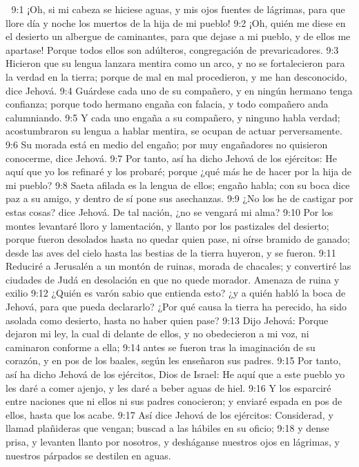 
9:1 ¡Oh, si mi cabeza se hiciese aguas, y mis ojos fuentes de lágrimas, para que llore día y noche los muertos de la hija de mi pueblo!  
9:2 ¡Oh, quién me diese en el desierto un albergue de caminantes, para que dejase a mi pueblo, y de ellos me apartase! Porque todos ellos son adúlteros, congregación de prevaricadores.  
9:3 Hicieron que su lengua lanzara mentira como un arco, y no se fortalecieron para la verdad en la tierra; porque de mal en mal procedieron, y me han desconocido, dice Jehová.  
9:4 Guárdese cada uno de su compañero, y en ningún hermano tenga confianza; porque todo hermano engaña con falacia, y todo compañero anda calumniando.  
9:5 Y cada uno engaña a su compañero, y ninguno habla verdad; acostumbraron su lengua a hablar mentira, se ocupan de actuar perversamente.  
9:6 Su morada está en medio del engaño; por muy engañadores no quisieron conocerme, dice Jehová.  
9:7 Por tanto, así ha dicho Jehová de los ejércitos: He aquí que yo los refinaré y los probaré; porque ¿qué más he de hacer por la hija de mi pueblo?  
9:8 Saeta afilada es la lengua de ellos; engaño habla; con su boca dice paz a su amigo, y dentro de sí pone sus asechanzas.  
9:9 ¿No los he de castigar por estas cosas? dice Jehová. De tal nación, ¿no se vengará mi alma?  
9:10 Por los montes levantaré lloro y lamentación, y llanto por los pastizales del desierto; porque fueron desolados hasta no quedar quien pase, ni oírse bramido de ganado; desde las aves del cielo hasta las bestias de la tierra huyeron, y se fueron.  
9:11 Reduciré a Jerusalén a un montón de ruinas, morada de chacales; y convertiré las ciudades de Judá en desolación en que no quede morador.  
Amenaza de ruina y exilio  
9:12 ¿Quién es varón sabio que entienda esto? ¿y a quién habló la boca de Jehová, para que pueda declararlo? ¿Por qué causa la tierra ha perecido, ha sido asolada como desierto, hasta no haber quien pase?  
9:13 Dijo Jehová: Porque dejaron mi ley, la cual di delante de ellos, y no obedecieron a mi voz, ni caminaron conforme a ella;  
9:14 antes se fueron tras la imaginación de su corazón, y en pos de los baales, según les enseñaron sus padres.  
9:15 Por tanto, así ha dicho Jehová de los ejércitos, Dios de Israel: He aquí que a este pueblo yo les daré a comer ajenjo, y les daré a beber aguas de hiel.  
9:16 Y los esparciré entre naciones que ni ellos ni sus padres conocieron; y enviaré espada en pos de ellos, hasta que los acabe.  
9:17 Así dice Jehová de los ejércitos: Considerad, y llamad plañideras que vengan; buscad a las hábiles en su oficio;  
9:18 y dense prisa, y levanten llanto por nosotros, y desháganse nuestros ojos en lágrimas, y nuestros párpados se destilen en aguas.  
